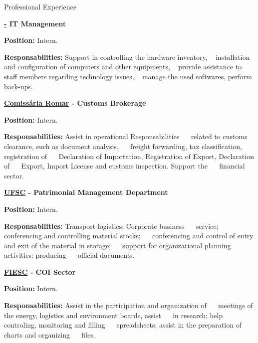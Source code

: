 \begin{rubric}{Professional Experience}{

  \entry*[2016]
  \textbf{\href{http://www.sds.sc.gov.br/Secretaria do Estado}
    - IT Management}

  \textbf{Position:} Intern.

  \textbf{Responsabilities:} Support in controlling the hardware inventory,
  installation and configuration of computers and other equipments,
  provide assistance to staff members regarding technology issues,
  manage the used softwares, perform back-ups.


  \entry*[2014]
  \textbf{\href{http://www.comissariaromar.com.br/}{Comissária Romar}
    - Customs Brokerage}

  \textbf{Position:} Intern.

  \textbf{Responsabilities:} Assist in operational Responsabilities
   related to customs clearance, such as document analysis,
   freight forwarding, tax classification, registration of
   Declaration of Importation, Registration of Export, Declaration of
   Export, Import License and customs inspection. Support the
   financial sector.

  \entry*[2013 - 2014]
  \textbf{\href{http://www.ufsc.br/}{UFSC} - Patrimonial Management
    Department}

  \textbf{Position:} Intern.

  \textbf{Responsabilities:} Transport logistics; Corporate business
   service; conferencing and controlling material stocks;
   conferencing and control of entry and exit of the material in storage;
   support for organizational planning activities; producing
   official documents.


  \entry*[2012 - 2013]
  \textbf{\href{http://www.fiesc.com.br/}{FIESC} - COI Sector}

  \textbf{Position:} Intern.

  \textbf{Responsabilities:} Assist in the participation and organization of
   meetings of the energy, logistics and environment boards, assist
   in research; help controling, monitoring and filling
   spreadsheets; assist in the preparation of charts and organizing
   files.

}\end{rubric}

